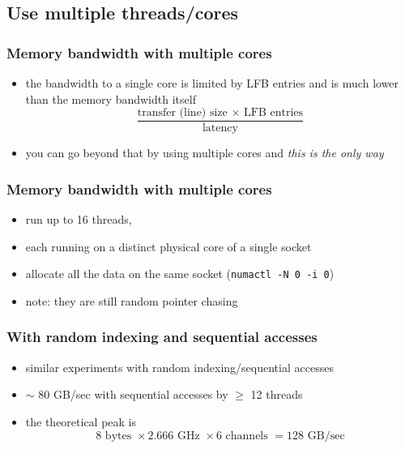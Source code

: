 \documentclass[12pt,dvipdfmx]{beamer}
\newcommand{\ao}[1]{{\color{blue}#1}}
\begin{document}
\subsection{Use multiple threads/cores}

\begin{frame}
\frametitle{Memory bandwidth with multiple cores}
\begin{itemize}
\item the bandwidth to a single core is limited by LFB entries
  and is much lower than the memory bandwidth itself
  \[ \frac{\mbox{transfer (line) size }
      \times \mbox{ LFB entries}}{\mbox{latency}} \]
\item you can go beyond that by using multiple cores
  and \ao{\it this is the only way}
\end{itemize}
\end{frame}

\begin{frame}
\frametitle{Memory bandwidth with multiple cores}
\begin{itemize}
\item run up to 16 threads,
\item each running on a
  distinct physical core of a single socket
\item allocate all the data on the same socket ({\tt numactl -N 0 -i 0})
\item note: they are still random pointer chasing
\end{itemize}
\begin{center}
{\scriptsize}
\end{center}
\end{frame}

\begin{frame}
\frametitle{With random indexing and sequential accesses}
\begin{itemize}
\item similar experiments with random indexing/sequential accesses
\item $\sim$ 80 GB/sec with sequential accesses by $\geq$ 12 threads
\item the theoretical peak is
  \[ 8 \mbox{ bytes } \times 2.666 \mbox{ GHz }
    \times 6 \mbox{ channels } = 128 \mbox{ GB/sec} \]
  
\begin{center}
\def\svgwidth{0.7\textwidth}
{\scriptsize}
\end{center}

\end{itemize}
\end{frame}
\end{document}
